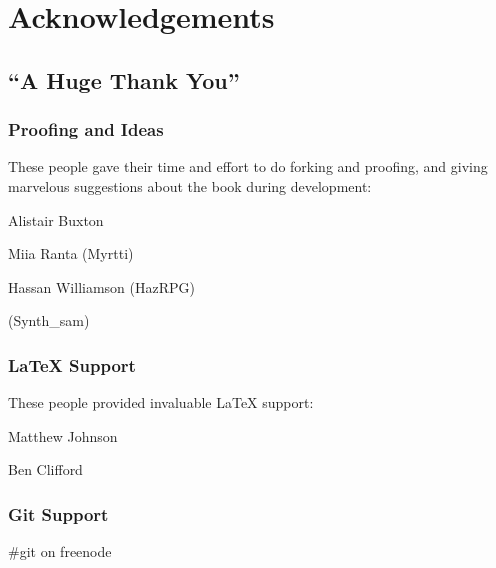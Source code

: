 \chapter{Acknowledgements}
\section{``A Huge Thank You''}

\subsection{Proofing and Ideas}
These people gave their time and effort to do forking and proofing, and giving marvelous suggestions about the book during development:

Alistair Buxton

Miia Ranta (Myrtti)

Hassan Williamson (HazRPG)

(Synth_sam)

\subsection{\LaTeX{} Support}
These people provided invaluable \LaTeX{} support:

Matthew Johnson

Ben Clifford

\subsection{Git Support}
\#git on freenode
